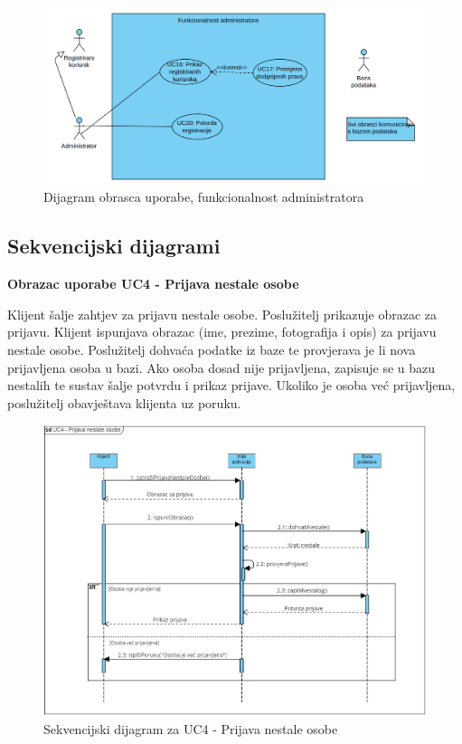 				    \begin{figure}[h!] \includegraphics[width=\linewidth]{dijagrami/UML3.vpd.jpg} 
				    \caption{Dijagram obrasca uporabe, funkcionalnost administratora}
				    \end{figure} 
					
				\eject		
				
				\subsection{Sekvencijski dijagrami}
				
				\textbf{Obrazac uporabe UC4 - Prijava nestale osobe}
    
                Klijent šalje zahtjev za prijavu nestale osobe. Poslužitelj prikazuje obrazac za prijavu. Klijent ispunjava obrazac (ime, prezime, fotografija i opis) za prijavu nestale osobe. Poslužitelj dohvaća podatke iz baze te provjerava je li nova prijavljena osoba u bazi. Ako osoba dosad nije prijavljena, zapisuje se u bazu nestalih te sustav šalje potvrdu i prikaz prijave. Ukoliko je osoba već prijavljena, poslužitelj obavještava klijenta uz poruku.

                \begin{figure}[H] \includegraphics[width=\linewidth]{./dijagrami/PrijavaNestalog.jpg}
				    \caption{Sekvencijski dijagram za UC4 - Prijava nestale osobe}
				    \end{figure}

